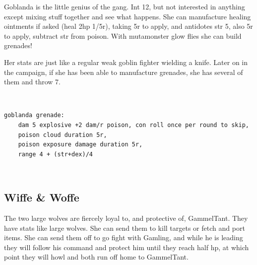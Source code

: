 Goblanda is the little genius of the gang. Int 12, but not interested in anything except mixing stuff together and see what happens. She can manufacture healing ointments if asked (heal 2hp 1/5r), taking 5r to apply, and antidotes str 5, also 5r to apply, subtract str from poison. With mutamonster glow flies she can build grenades!

Her stats are just like a regular weak goblin fighter wielding a knife. Later on in the campaign, if she has been able to manufacture grenades, she has several of them and throw 7.

\

\begin{samepage} \begin{small} \begin{verbatim}
goblanda grenade:
    dam 5 explosive +2 dam/r poison, con roll once per round to skip, 
    poison cloud duration 5r, 
    poison exposure damage duration 5r,
    range 4 + (str+dex)/4
\end{verbatim} \end{small} \end{samepage}


\

\subsection*{Wiffe \& Woffe}

The two large wolves are fiercely loyal to, and protective of, GammelTant. They have stats like large wolves. She can send them to kill targets or fetch and port items. She can send them off to go fight with Gamling, and while he is leading they will follow his command and protect him until they reach half hp, at which point they will howl and both run off home to GammelTant.



















\clearpage
\raggedbottom
